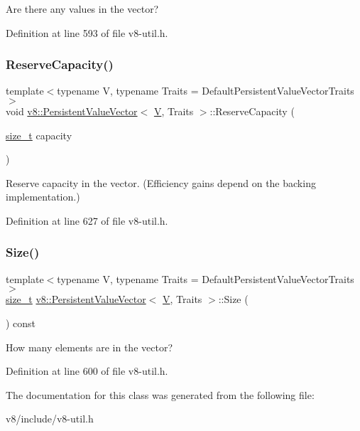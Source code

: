 Are there any values in the vector? 

Definition at line 593 of file v8-\/util.\+h.

\mbox{\label{classv8_1_1PersistentValueVector_ad4cccfee3a275986578276efe0c78510}} 
\subsubsection{\texorpdfstring{Reserve\+Capacity()}{ReserveCapacity()}}
{\footnotesize\ttfamily template$<$typename V, typename Traits = Default\+Persistent\+Value\+Vector\+Traits$>$ \\
void \mbox{\hyperlink{classv8_1_1PersistentValueVector}{v8\+::\+Persistent\+Value\+Vector}}$<$ \mbox{\hyperlink{classV}{V}}, Traits $>$\+::Reserve\+Capacity (\begin{DoxyParamCaption}\item[{\mbox{\hyperlink{classsize__t}{size\+\_\+t}}}]{capacity }\end{DoxyParamCaption})\hspace{0.3cm}{\ttfamily [inline]}}

Reserve capacity in the vector. (Efficiency gains depend on the backing implementation.) 

Definition at line 627 of file v8-\/util.\+h.

\mbox{\label{classv8_1_1PersistentValueVector_adf4e13701de97acc753ca294c66b9f35}} 
\subsubsection{\texorpdfstring{Size()}{Size()}}
{\footnotesize\ttfamily template$<$typename V, typename Traits = Default\+Persistent\+Value\+Vector\+Traits$>$ \\
\mbox{\hyperlink{classsize__t}{size\+\_\+t}} \mbox{\hyperlink{classv8_1_1PersistentValueVector}{v8\+::\+Persistent\+Value\+Vector}}$<$ \mbox{\hyperlink{classV}{V}}, Traits $>$\+::Size (\begin{DoxyParamCaption}{ }\end{DoxyParamCaption}) const\hspace{0.3cm}{\ttfamily [inline]}}

How many elements are in the vector? 

Definition at line 600 of file v8-\/util.\+h.



The documentation for this class was generated from the following file\+:\begin{DoxyCompactItemize}
\item 
v8/include/v8-\/util.\+h\end{DoxyCompactItemize}
